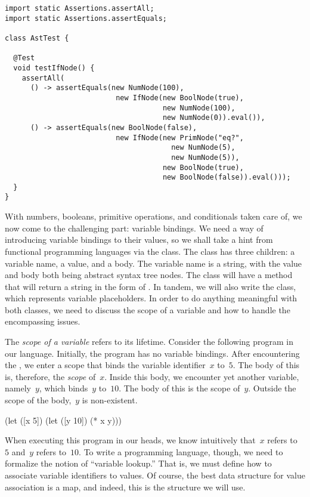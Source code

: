\begin{lstlisting}[language=MyJava]
import static Assertions.assertAll;
import static Assertions.assertEquals;

class AstTest {
  
  @Test
  void testIfNode() {
    assertAll(
      () -> assertEquals(new NumNode(100),
                          new IfNode(new BoolNode(true),
                                     new NumNode(100),
                                     new NumNode(0)).eval()),
      () -> assertEquals(new BoolNode(false),
                          new IfNode(new PrimNode("eq?", 
                                       new NumNode(5), 
                                       new NumNode(5)),
                                     new BoolNode(true),
                                     new BoolNode(false)).eval()));
  }
}  
\end{lstlisting}

With numbers, booleans, primitive operations, and conditionals taken care of, we now come to the challenging part: variable bindings. 
We need a way of introducing variable bindings to their values, so we shall take a hint from functional programming languages via the  class. 
The  class has three children: a variable name, a value, and a body. 
The variable name is a string, with the value and body both being abstract syntax tree nodes. 
The  class will have a  method that will return a string in the form of . 
In tandem, we will also write the  class, which represents variable placeholders. In order to do anything meaningful with both classes, we need to discuss the scope of a variable and how to handle the encompassing issues.

The \emph{scope of a variable} refers to its lifetime.
Consider the following program in our language. Initially, the program has no variable bindings. 
After encountering the , we enter a scope that binds the variable identifier~$x$ to~$5$. 
The body of this  is, therefore, the \emph{scope} of~$x$. 
Inside this body, we encounter yet another variable, namely~$y$, which binds~$y$ to~$10$. 
The body of this  is the scope of~$y$. Outside the scope of the body,~$y$ is non-existent.
\begin{verbnobox}[\small]
(let ([x 5])
  (let ([y 10])
    (* x y)))
\end{verbnobox}
When executing this program in our heads, we know intuitively that~$x$ refers to~$5$ and~$y$ refers to~$10$. 
To write a programming language, though, we need to formalize the notion of ``variable lookup.'' That is, we must define how to associate variable identifiers to values. 
Of course, the best data structure for value association is a map, and indeed, this is the structure we will use.

